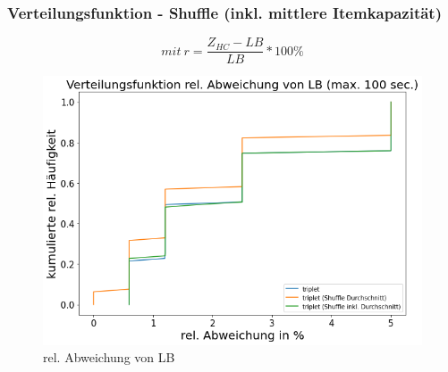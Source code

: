 \documentclass{beamer}
\begin{document}
\begin{frame}

\frametitle{Verteilungsfunktion - Shuffle (inkl. mittlere Itemkapazität)}

\begin{footnotesize}
\begin{equation}
mit \ r = \frac{Z_{HC}-LB}{LB} * 100\%
\end{equation}
\end{footnotesize}

\begin{figure}[!htbp]
\begin{center}
\includegraphics[scale=0.3]{img/dist9.png}
\end{center}
\caption{rel. Abweichung von LB}
\label{fig:architecture}
\end{figure}



\end{frame}

\end{document}
